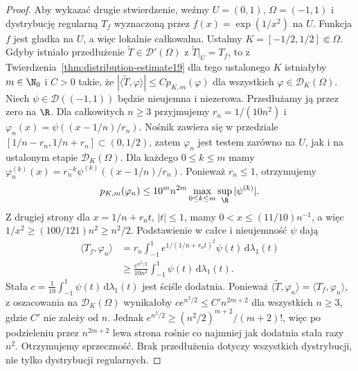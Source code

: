 \begin{proof}
Aby wykazać drugie stwierdzenie, weźmy
$U=(0,1)$, $\Omega=(-1,1)$ i dystrybucję regularną
$T_f$ wyznaczoną przez $f(x)=\exp(1/x^2)$ na $U$.
Funkcja $f$ jest gładka na $U$, a więc lokalnie
całkowalna. Ustalmy $K=[-1/2,1/2]\Subset\Omega$.
Gdyby istniało przedłużenie
$\widetilde T\in\mathcal D'(\Omega)$ z
$\widetilde T|_U=T_f$, to z
Twierdzenia~\ref{thm:distribution-estimate19}
dla tego ustalonego $K$ istniałyby $m\in\N_0$
i $C>0$ takie, że
$|\langle\widetilde T,\varphi\rangle|\le C p_{K,m}(\varphi)$
dla wszystkich $\varphi\in\mathcal D_K(\Omega)$.
Niech $\psi\in\mathcal D((-1,1))$ będzie nieujemna
i niezerowa. Przedłużamy ją przez zero na $\R$.
Dla całkowitych $n\ge3$ przyjmujemy
$r_n=1/(10n^2)$ i
$\varphi_n(x)=\psi((x-1/n)/r_n)$.
Nośnik zawiera się w przedziale
$[1/n-r_n,1/n+r_n]\subset(0,1/2)$, zatem
$\varphi_n$ jest testem zarówno na $U$, jak i na
ustalonym etapie $\mathcal D_K(\Omega)$.
Dla każdego $0\le k\le m$ mamy
$\varphi_n^{(k)}(x)=r_n^{-k}\psi^{(k)}((x-1/n)/r_n)$.
Ponieważ $r_n\le1$, otrzymujemy
\[
 p_{K,m}(\varphi_n)
 \le 10^m n^{2m}\max_{0\le k\le m}
 \sup_{\R}|\psi^{(k)}|.
\]
Z drugiej strony dla $x=1/n+r_nt$, $|t|\le1$,
mamy $0<x\le(11/10)n^{-1}$, a więc
$1/x^2\ge(100/121)n^2\ge n^2/2$.
Podstawienie w całce i nieujemność $\psi$ dają
\[
 \begin{aligned}
 \langle T_f,\varphi_n\rangle
 &=r_n\int_{-1}^1 e^{1/(1/n+r_nt)^2}\psi(t)\,
 \mathrm d\lambda_1(t)\\
 &\ge \frac{e^{n^2/2}}{10n^2}
 \int_{-1}^1\psi(t)\,\mathrm d\lambda_1(t).
 \end{aligned}
\]
Stała $c=\frac1{10}\int_{-1}^1\psi(t)\,\mathrm d\lambda_1(t)$
jest ściśle dodatnia. Ponieważ
$\langle\widetilde T,\varphi_n\rangle=
\langle T_f,\varphi_n\rangle$, z oszacowania na
$\mathcal D_K(\Omega)$ wynikałoby
$c e^{n^2/2}\le C' n^{2m+2}$ dla wszystkich $n\ge3$,
gdzie $C'$ nie zależy od $n$. Jednak
$e^{n^2/2}\ge (n^2/2)^{m+2}/(m+2)!$,
więc po podzieleniu przez $n^{2m+2}$ lewa strona
rośnie co najmniej jak dodatnia stała razy $n^2$.
Otrzymujemy sprzeczność. Brak przedłużenia dotyczy
wszystkich dystrybucji, nie tylko dystrybucji regularnych.
\end{proof}
